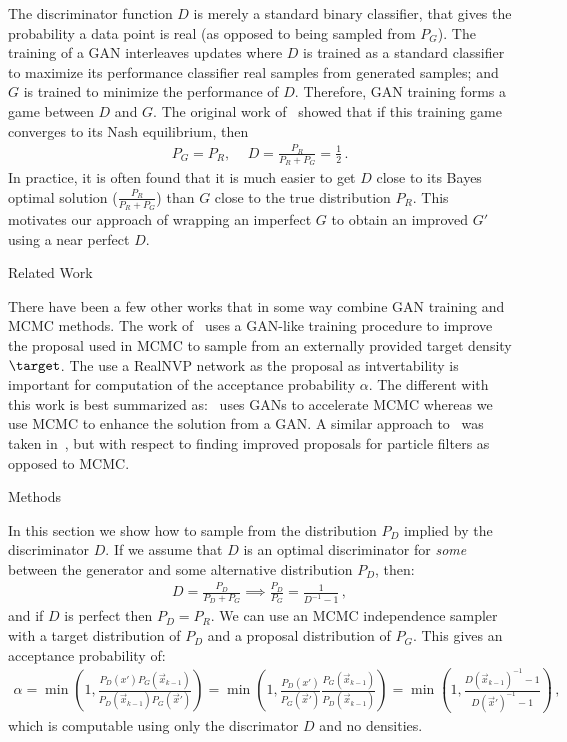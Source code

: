The discriminator function $D$ is merely a standard binary classifier, that gives the probability a data point is real (as opposed to being sampled from $P_G$)\@.
The training of a GAN interleaves updates where $D$ is trained as a standard classifier to maximize its performance classifier real samples from generated samples; and $G$ is trained to minimize the performance of $D$.
Therefore, GAN training forms a game between $D$ and $G$.
The original work of~\citet{} showed that if this training game converges to its Nash equilibrium, then
\begin{align}
  P_G = P_R,\, \quad D = \frac{P_R}{P_R + P_G} = \frac{1}{2}\,.
\end{align}
In practice, it is often found that it is much easier to get $D$ close to its Bayes optimal solution ($\frac{P_R}{P_R + P_G}$) than $G$ close to the true distribution $P_R$.
This motivates our approach of wrapping an imperfect $G$ to obtain an improved $G'$ using a near perfect $D$.

Related Work

There have been a few other works that in some way combine GAN training and MCMC methods.
The work of~\citept{} uses a GAN-like training procedure to improve the proposal used in MCMC to sample from an externally provided target density $\target$.
The use a RealNVP network as the proposal as intvertability is important for computation of the acceptance probability $\alpha$.
The different with this work is best summarized as:~\citet{} uses GANs to accelerate MCMC whereas we use MCMC to enhance the solution from a GAN.
A similar approach to~\citet{} was taken in~\citet{}, but with respect to finding improved proposals for particle filters as opposed to MCMC\@.

Methods

In this section we show how to sample from the distribution $P_D$ implied by the discriminator $D$.
If we assume that $D$ is an optimal discriminator for \emph{some} between the generator and some alternative distribution $P_D$, then:
\begin{align}
  D = \frac{P_D}{P_D + P_G} \implies \frac{P_D}{P_G} = \frac{1}{D^{-1}-1}\,, \label{eq:PD def}
\end{align}
and if $D$ is perfect then $P_D = P_R$.
We can use an MCMC independence sampler with a target distribution of $P_D$ and a proposal distribution of $P_G$.
This gives an acceptance probability of:
\begin{align}
  \alpha = \min(1, \frac{P_D(x')P_G(\vec x_{k-1})}{P_D(\vec x_{k-1})P_G(\vec x')})
    = \min(1, \frac{P_D(x')}{P_G(\vec x')} \frac{P_G(\vec x_{k-1})}{P_D(\vec x_{k-1})})
    = \min(1, \frac{D(\vec x_{k-1})^{-1} - 1}{D(\vec x')^{-1} - 1})\,, \label{eq:alpha from D}
\end{align}
which is computable using only the discrimator $D$ and no densities.

